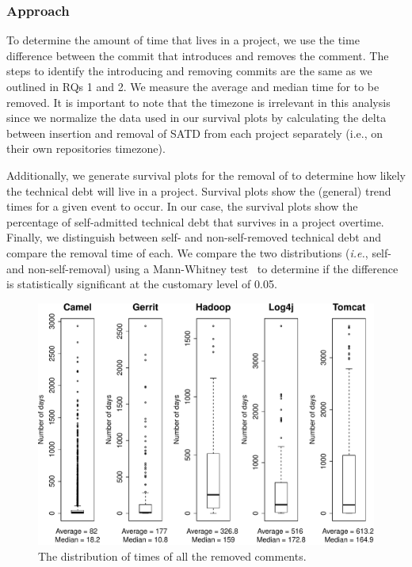 \subsubsection*{Approach} To determine the amount of time that \SATD lives in a project, we use the time difference between the commit that introduces and removes the \SATD comment. The steps to identify the \SATD introducing and removing commits are the same as we outlined in RQs 1 and 2. We measure the average and median time for \SATD to be removed. It is important to note that the timezone is irrelevant in this analysis since we normalize the data used in our survival plots by calculating the delta between insertion and removal of SATD from each project separately (i.e., on their own repositories timezone).

Additionally, we generate survival plots for the removal of \SATD to determine how likely the technical debt will live in a project. Survival plots show the (general) trend times for a given event to occur. In our case, the survival plots show the  percentage of self-admitted technical debt that survives in a project overtime. Finally, we distinguish between self- and non-self-removed technical debt and compare the removal time of each. We compare the two distributions (\emph{i.e.}, self- and non-self-removal) using a Mann-Whitney test~\cite{mann1947test} to determine if the difference is statistically significant at the customary level of 0.05.




\begin{figure}[t]
	\centering
	\includegraphics[width=\columnwidth]{figures/test/distribution_.pdf}
	\caption{The distribution of times of all the removed \SATD comments.}
	\label{fig:removed_all_std_comments}
\end{figure}




